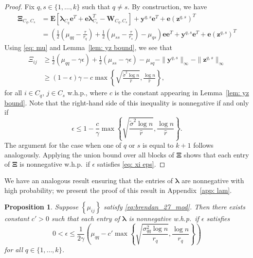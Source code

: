 \documentclass[twoside,11pt]{article}
\newtheorem{proposition}{Proposition}[section]
\newcommand{\E}{\mathbf{E}}
\newcommand{\bs}{\boldsymbol}
\newcommand{\0}{\bs{0}}
\newcommand{\sbra}[1] {\ensuremath{ \left[ #1\right]}} %
\newcommand{\rbra}[1]{\ensuremath{\left( #1 \right)}} %
\newcommand{\bra}[1]{\ensuremath{\left\{ #1 \right\}}} %
\begin{document}
{\begin{proof}
	Fix $q,s \in \{1, \dots, k\}$ such that $q \neq s$.
	By construction, we have
	\begin{align*}
	\bs{\Xi}_{C_q,C_s} %
	&= \E\sbra{\bs{\lambda}_{C_q}\bs{e}^T+\bs{e}\bs{\lambda}_{C_s}^T - \bs{W}_{C_q,C_s}}+ \bs{y}^{q,s}\bs{e}^T+\bs{e}
	\left(\bs{z}^{q,s}\right)^T \\
	&= \left(\frac{1}{2} \left(\mu_{qq} - \frac{\tau}{r_q} \right) + \frac{1}{2} \left(\mu_{ss} - \frac{\tau}{r_s} \right) - \mu_{qs} \right)
	\bs{e}\bs{e}^T + \bs{y}^{q,s}\bs{e}^T+\bs{e}\left(\bs{z}^{q,s}\right)^T
	\end{align*}
	Using
	\eqref{eq: mu} and
	 Lemma~\ref{lem: yz bound}, we see that
	\begin{align*}
	\Xi_{ij} &\geq \frac{1}{2} \left(\mu_{qq} - \gamma \epsilon \right) + \frac{1}{2} \left(\mu_{ss} - \gamma \epsilon \right) - \mu_{sq} -
	\|\bs{y}^{q,s}\|_{\infty}-\|\bs{z}^{q,s}\|_{\infty} \\
	& \ge (1 - \epsilon)\gamma - c \max \bra{ \sqrt{ \frac{\tilde \sigma^2 \log n}{\hat r}} ,
			\frac{\log n}{\hat r} },
	\end{align*}
	for all $i \in C_q$, $j\in C_s$ w.h.p., where $c$ is the constant appearing in
	Lemma~\ref{lem: yz bound}. Note that
	the right-hand side of this inequality is nonnegative	if and only if
	\[\epsilon \leq 1 - \frac{c}{\gamma}\max \bra{ \sqrt{ \frac{\tilde \sigma^2 \log n}{\hat r}} ,
			\frac{\log n}{\hat r} } . \]
	The argument for the case when one of $q$ or $s$ is equal to $k+1$
	follows analogously.
	Applying the union bound over all blocks of \(\bs \Xi\) shows that each entry
	of $\bs{\Xi}$ is nonnegative
	w.h.p.~if $\epsilon$ satisfies \eqref{eq: xi eps}.
\end{proof}
\medskip

We have an analogous result ensuring that the entries of \(\bs\lambda\) are nonnegative
with high probability; we present the proof of this result in Appendix~\ref{app: lam}.

\begin{proposition} \label{prop: lam}
	Suppose $\bra{\mu_{ij}}$ satisfy \eqref{eq:brendan_27_mod}. Then there
	exists constant $c' > 0$ such that each entry of $\bs{\lambda}$ is nonnegative w.h.p.~if $\epsilon$ satisfies
	\begin{equation} \label{eq: lam eps}
	0 < \epsilon \leq  \frac{1}{2\gamma}
	\rbra{ \mu_{qq}  - c' \max \bra{ \sqrt{  \frac{\sigma_{qq}^2 \log 		n }{r_q} },
			\frac{\log n }{r_q} } }
	\end{equation}
	for all $ q \in \{1,\dots, k\}$.
\end{proposition}

}
\end{document}
